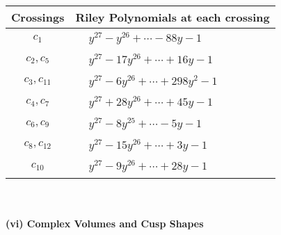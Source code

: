 \documentclass[1p]{elsarticle_modified}
\theoremstyle{definition}
\begin{document}
\begin{tabular}{m{50pt}|m{274pt}}
Crossings & \hspace{64pt}Riley Polynomials at each crossing \\
\hline $$\begin{aligned}c_{1}\end{aligned}$$&$\begin{aligned}
&y^{27}- y^{26}+\cdots-88 y-1
\end{aligned}$\\
\hline $$\begin{aligned}c_{2},c_{5}\end{aligned}$$&$\begin{aligned}
&y^{27}-17 y^{26}+\cdots+16 y-1
\end{aligned}$\\
\hline $$\begin{aligned}c_{3},c_{11}\end{aligned}$$&$\begin{aligned}
&y^{27}-6 y^{26}+\cdots+298 y^2-1
\end{aligned}$\\
\hline $$\begin{aligned}c_{4},c_{7}\end{aligned}$$&$\begin{aligned}
&y^{27}+28 y^{26}+\cdots+45 y-1
\end{aligned}$\\
\hline $$\begin{aligned}c_{6},c_{9}\end{aligned}$$&$\begin{aligned}
&y^{27}-8 y^{25}+\cdots-5 y-1
\end{aligned}$\\
\hline $$\begin{aligned}c_{8},c_{12}\end{aligned}$$&$\begin{aligned}
&y^{27}-15 y^{26}+\cdots+3 y-1
\end{aligned}$\\
\hline $$\begin{aligned}c_{10}\end{aligned}$$&$\begin{aligned}
&y^{27}-9 y^{26}+\cdots+28 y-1
\end{aligned}$\\
\hline
\end{tabular}\\~\\
\newpage\flushleft \textbf{(vi) Complex Volumes and Cusp Shapes}
\end{document}
